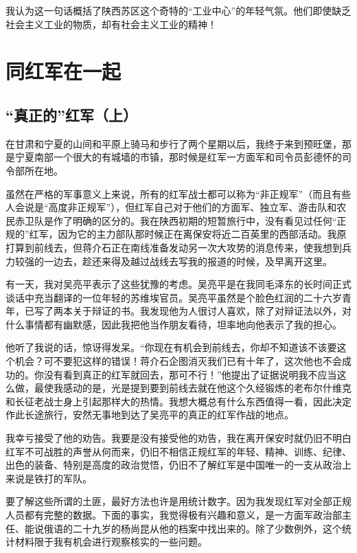 \documentclass[10pt]{book}
\begin{document}
我认为这一句话概括了陕西苏区这个奇特的“工业中心”的年轻气氛。他们即使缺乏社会主义工业的物质，却有社会主义工业的精神！

\chapter{同红军在一起}

\section{“真正的”红军（上）}

在甘肃和宁夏的山间和平原上骑马和步行了两个星期以后，我终于来到预旺堡，那是宁夏南部一个很大的有城墙的市镇，那时候是红军一方面军和司令员彭德怀的司令部所在地。

虽然在严格的军事意义上来说，所有的红军战士都可以称为“非正规军”（而且有些人会说是“高度非正规军”），但红军自己对于他们的方面军、独立军、游击队和农民赤卫队是作了明确的区分的。我在陕西初期的短暂旅行中，没有看见过任何“正规的”红军，因为它的主力部队那时候正在离保安将近二百英里的西部活动。我原打算到前线去，但蒋介石正在南线准备发动另一次大攻势的消息传来，使我想到兵力较强的一边去，趁还来得及越过战线去写我的报道的时候，及早离开这里。

有一天，我对吴亮平表示了这些犹豫的考虑。吴亮平是在我同毛泽东的长时间正式谈话中充当翻译的一位年轻的苏维埃官员。吴亮平虽然是个脸色红润的二十六岁青年，已写了两本关于辩证的书。我发现他为人很讨人喜欢，除了对辩证法以外，对什么事情都有幽默感，因此我把他当作朋友看待，坦率地向他表示了我的担心。

他听了我说的话，惊讶得发呆。“你现在有机会到前线去，你却不知道该不该要这个机会？可不要犯这样的错误！蒋介石企图消灭我们已有十年了，这次他也不会成功的。你没有看到真正的红军就回去，那可不行！”他提出了证据说明我不应当这么做，最使我感动的是，光是提到要到前线去就在他这个久经锻炼的老布尔什维克和长征老战士身上引起那样大的热情。我想大概总有什么东西值得一看，因此决定作此长途旅行，安然无事地到达了吴亮平的真正的红军作战的地点。

我幸亏接受了他的劝告。我要是没有接受他的劝告，我在离开保安时就仍旧不明白红军不可战胜的声誉从何而来，仍旧不相信正规红军的年轻、精神、训练、纪律、出色的装备、特别是高度的政治觉悟，仍旧不了解红军是中国唯一的一支从政治上来说是铁打的军队。

要了解这些所谓的土匪，最好方法也许是用统计数字。因为我发现红军对全部正规人员都有完整的数据。下面的事实，我觉得极有兴趣和意义，是一方面军政治部主任、能说俄语的二十九岁的杨尚昆从他的档案中找出来的。除了少数例外，这个统计材料限于我有机会进行观察核实的一些问题。
\end{document}
